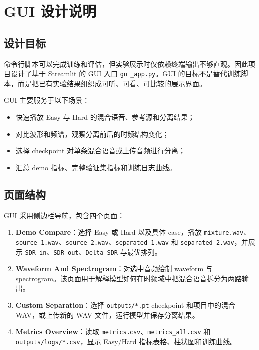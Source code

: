 \section{GUI 设计说明}

\subsection{设计目标}

命令行脚本可以完成训练和评估，但实验展示时仅依赖终端输出不够直观。因此项目设计了基于 Streamlit 的 GUI 入口 \texttt{gui\_app.py}。GUI 的目标不是替代训练脚本，而是把已有实验结果组织成可听、可看、可比较的展示界面。

GUI 主要服务于以下场景：

\begin{itemize}
    \item 快速播放 Easy 与 Hard 的混合语音、参考源和分离结果；
    \item 对比波形和频谱，观察分离前后的时频结构变化；
    \item 选择 checkpoint 对单条混合语音或上传音频进行分离；
    \item 汇总 demo 指标、完整验证集指标和训练日志曲线。
\end{itemize}

\subsection{页面结构}

GUI 采用侧边栏导航，包含四个页面：

\begin{enumerate}
    \item \textbf{Demo Compare}：选择 Easy 或 Hard 以及具体 case，播放 \texttt{mixture.wav}、\texttt{source\_1.wav}、\texttt{source\_2.wav}、\texttt{separated\_1.wav} 和 \texttt{separated\_2.wav}，并展示 \texttt{SDR\_in}、\texttt{SDR\_out}、\texttt{Delta\_SDR} 与最优排列。
    \item \textbf{Waveform And Spectrogram}：对选中音频绘制 waveform 与 spectrogram。该页面用于解释模型如何在时频域中把混合语音拆分为两路输出。
    \item \textbf{Custom Separation}：选择 \texttt{outputs/*.pt} checkpoint 和项目中的混合 WAV，或上传新的 WAV 文件，运行模型并保存分离结果。
    \item \textbf{Metrics Overview}：读取 \texttt{metrics.csv}、\texttt{metrics\_all.csv} 和 \texttt{outputs/logs/*.csv}，显示 Easy/Hard 指标表格、柱状图和训练曲线。
\end{enumerate}

